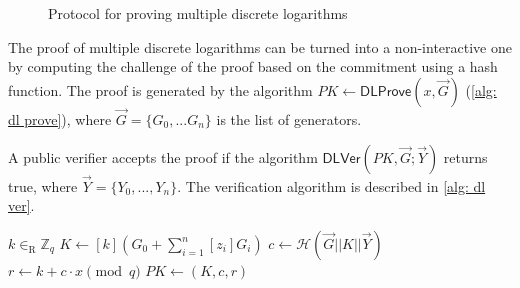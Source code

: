 \begin{figure}[ht]
    \caption{Protocol for proving multiple discrete logarithms}
    \label{fig: protocol for proving multiple discrete logarithms}
\end{figure}

The proof of multiple discrete logarithms can be turned into a non-interactive one by computing the challenge of the proof based on the commitment using a hash function. The proof is generated by the algorithm $PK \gets \mathsf{DLProve}(x, \vec{G})$ (\cref{alg: dl prove}), where $\vec{G} = \{ G_0, ... G_n \}$ is the list of generators.

A public verifier accepts the proof if the algorithm $\mathsf{DLVer}(PK, \vec{G}; \vec{Y})$ returns true, where $\vec{Y} = \{ Y_0, ..., Y_n \}$. The verification algorithm is described in \cref{alg: dl ver}.

\begin{algorithm}[ht]
    \DontPrintSemicolon
    \caption{$\mathsf{DLProve} (x, \vec{G})$}
    \label{alg: dl prove}
    
    $k \in_\mathrm{R} \mathbb{Z}_q$ \;
    $K \gets [k](G_0 + \sum\limits_{i=1}^n [z_i]G_i)$ \;
    $c \gets \mathcal{H}(\vec{G} || K || \vec{Y})$ \;
    $r \gets k + c \cdot x \pmod q$ \;
    $PK \gets (K, c, r)$ \;
     
\end{algorithm}

\begin{algorithm}[ht]
    \DontPrintSemicolon
    \caption{$\mathsf{DLVer}(PK, \vec{G}; \vec{Y})$}
    \label{alg: dl ver}
    
     
\end{algorithm}
